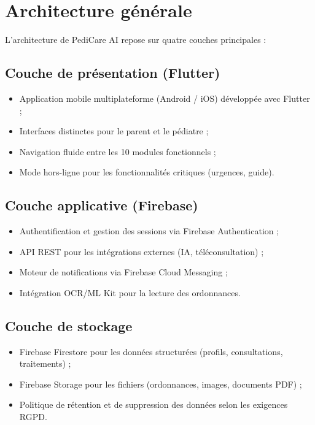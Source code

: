 \documentclass[11pt,a4paper]{article}
\begin{document}
\section{Architecture générale}

L'architecture de PediCare AI repose sur quatre couches principales :

\subsection{Couche de présentation (Flutter)}
\begin{itemize}
  \item Application mobile multiplateforme (Android / iOS) développée avec Flutter ;
  \item Interfaces distinctes pour le parent et le pédiatre ;
  \item Navigation fluide entre les 10 modules fonctionnels ;
  \item Mode hors-ligne pour les fonctionnalités critiques (urgences, guide).
\end{itemize}

\subsection{Couche applicative (Firebase)}
\begin{itemize}
  \item Authentification et gestion des sessions via Firebase Authentication ;
  \item API REST pour les intégrations externes (IA, téléconsultation) ;
  \item Moteur de notifications via Firebase Cloud Messaging ;
  \item Intégration OCR/ML Kit pour la lecture des ordonnances.
\end{itemize}

\subsection{Couche de stockage}
\begin{itemize}
  \item Firebase Firestore pour les données structurées (profils, consultations, traitements) ;
  \item Firebase Storage pour les fichiers (ordonnances, images, documents PDF) ;
  \item Politique de rétention et de suppression des données selon les exigences RGPD.
\end{itemize}
\end{document}

